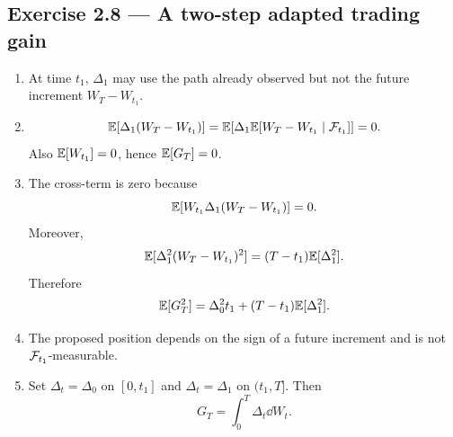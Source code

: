 \subsection*{Exercise 2.8 --- A two-step adapted trading gain}
\begin{enumerate}
  \item At time \(t_1\), \(\Delta_1\) may use the path already observed but
  not the future increment \(W_T-W_{t_1}\).
  \item
  \[
  \mathbb{E}[\Delta_1(W_T-W_{t_1})]
  =\mathbb{E}[\Delta_1\mathbb{E}[W_T-W_{t_1}\mid\mathcal{F}_{t_1}]]=0.
  \]
  Also \(\mathbb{E}[W_{t_1}]=0\), hence \(\mathbb{E}[G_T]=0\).
  \item The cross-term is zero because
  \[
  \mathbb{E}[W_{t_1}\Delta_1(W_T-W_{t_1})]=0.
  \]
  Moreover,
  \[
  \mathbb{E}[\Delta_1^2(W_T-W_{t_1})^2]
  =(T-t_1)\mathbb{E}[\Delta_1^2].
  \]
  Therefore
  \[
  \mathbb{E}[G_T^2]=\Delta_0^2t_1+(T-t_1)\mathbb{E}[\Delta_1^2].
  \]
  \item The proposed position depends on the sign of a future increment and
  is not \(\mathcal{F}_{t_1}\)-measurable.
  \item Set \(\Delta_t=\Delta_0\) on \([0,t_1]\) and
  \(\Delta_t=\Delta_1\) on \((t_1,T]\). Then
  \[
  G_T=\int_0^T\Delta_t\dd W_t.
  \]
\end{enumerate}
